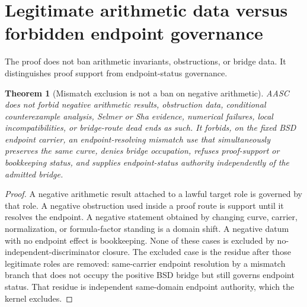 \documentclass[11pt]{article}
\newtheorem{theorem}{Theorem}[section]
\begin{document}
\section{Legitimate arithmetic data versus forbidden endpoint governance}

The proof does not ban arithmetic invariants, obstructions, or bridge data. It distinguishes proof support from endpoint-status governance.

\begin{theorem}[Mismatch exclusion is not a ban on negative arithmetic]\label{thm:nonexplosive-mismatch-exclusion}
AASC does not forbid negative arithmetic results, obstruction data, conditional counterexample analysis, Selmer or Sha evidence, numerical failures, local incompatibilities, or bridge-route dead ends as such. It forbids, on the fixed BSD endpoint carrier, an endpoint-resolving mismatch use that simultaneously preserves the same curve, denies bridge occupation, refuses proof-support or bookkeeping status, and supplies endpoint-status authority independently of the admitted bridge.
\end{theorem}

\begin{proof}
A negative arithmetic result attached to a lawful target role is governed by that role. A negative obstruction used inside a proof route is support until it resolves the endpoint. A negative statement obtained by changing curve, carrier, normalization, or formula-factor standing is a domain shift. A negative datum with no endpoint effect is bookkeeping. None of these cases is excluded by no-independent-discriminator closure. The excluded case is the residue after those legitimate roles are removed: same-carrier endpoint resolution by a mismatch branch that does not occupy the positive BSD bridge but still governs endpoint status. That residue is independent same-domain endpoint authority, which the kernel excludes.
\end{proof}
\end{document}
